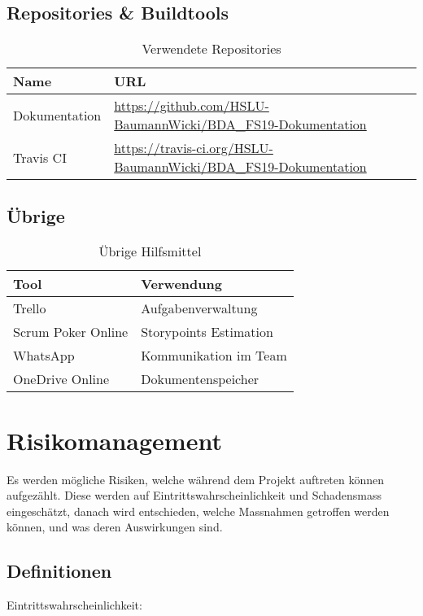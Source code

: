 \subsection{Repositories \& Buildtools}
\begin{table}[h!]
	\begin{tabular}{p{} p{}}
		\hline
		\textbf{Name} & \textbf{URL} \\
		\hline
		Dokumentation & \url{https://github.com/HSLU-BaumannWicki/BDA_FS19-Dokumentation} \\
		\hline	
		Travis CI &  \url{https://travis-ci.org/HSLU-BaumannWicki/BDA_FS19-Dokumentation} \\
		\hline
	\end{tabular}
	\caption{Verwendete Repositories}
\end{table}

\subsection{Übrige}
\begin{table}[h!]
	\begin{tabular}{p{} p{}}
		\hline
		\textbf{Tool} & \textbf{Verwendung} \\
		\hline
		Trello & Aufgabenverwaltung \\
		\hline
		Scrum Poker Online & Storypoints Estimation\\
		\hline
		WhatsApp & Kommunikation im Team \\
		\hline
		OneDrive Online & Dokumentenspeicher \\
		\hline	
	\end{tabular}
	\caption{Übrige Hilfsmittel}
\end{table}

\clearpage

\section{Risikomanagement}

Es werden mögliche Risiken, welche während dem Projekt auftreten können aufgezählt. Diese werden auf Eintrittswahrscheinlichkeit und Schadensmass eingeschätzt, danach wird entschieden, welche Massnahmen getroffen werden können, und was deren Auswirkungen sind.

\subsection{Definitionen}
\label{sssec:Def}
\vspace{1em}
\noindent
Eintrittswahrscheinlichkeit:

